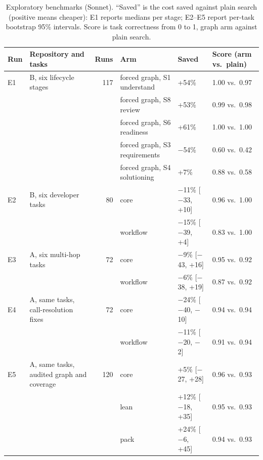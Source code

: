 \begin{table}[t]\centering\small
\caption{Exploratory benchmarks (Sonnet). ``Saved'' is the cost saved against plain search (positive means cheaper):
E1 reports medians per stage; E2--E5 report per-task bootstrap 95\% intervals. Score is task correctness from 0 to 1,
graph arm against plain search.}
\label{tab:exploratory}
\setlength{\tabcolsep}{5pt}
\begin{tabular}{@{}llrlll@{}}\toprule
Run & Repository and tasks & Runs & Arm & Saved & Score (arm vs.\ plain) \\\midrule
E1 & B, six lifecycle stages & 117 & forced graph, S1 understand & +54\% & 1.00 vs.\ 0.97 \\
   & & & forced graph, S8 review & +53\% & 0.99 vs.\ 0.98 \\
   & & & forced graph, S6 readiness & +61\% & 1.00 vs.\ 1.00 \\
   & & & forced graph, S3 requirements & $-$54\% & 0.60 vs.\ 0.42 \\
   & & & forced graph, S4 solutioning & +7\% & 0.88 vs.\ 0.58 \\\midrule
E2 & B, six developer tasks & 80 & core & $-$11\% [$-$33, +10] & 0.96 vs.\ 1.00 \\
   & & & workflow & $-$15\% [$-$39, +4] & 0.83 vs.\ 1.00 \\\midrule
E3 & A, six multi-hop tasks & 72 & core & $-$9\% [$-$43, +16] & 0.95 vs.\ 0.92 \\
   & & & workflow & $-$6\% [$-$38, +19] & 0.87 vs.\ 0.92 \\\midrule
E4 & A, same tasks, call-resolution fixes & 72 & core & $-$24\% [$-$40, $-$10] & 0.94 vs.\ 0.94 \\
   & & & workflow & $-$11\% [$-$20, $-$2] & 0.91 vs.\ 0.94 \\\midrule
E5 & A, same tasks, audited graph and coverage & 120 & core & +5\% [$-$27, +28] & 0.96 vs.\ 0.93 \\
   & & & lean & +12\% [$-$18, +35] & 0.95 vs.\ 0.93 \\
   & & & pack & +24\% [$-$6, +45] & 0.94 vs.\ 0.93 \\\bottomrule
\end{tabular}
\end{table}
